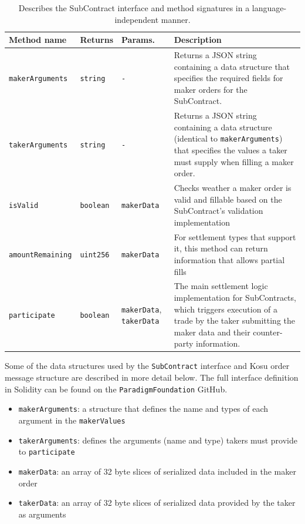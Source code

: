 \documentclass[10pt]{article}
\begin{document}
\bgroup
\def\arraystretch{1.2}
\begin{table}[H]
\centering
\label{table:table1}
\begin{tabularx}{1\textwidth}{|l|l|X|p{8cm}|}
\hline
\textbf{Method name} & \textbf{Returns} & \textbf{Params.} & \textbf{Description} \\ 
\hline
\texttt{makerArguments} & \texttt{string} & \texttt{-} & Returns a JSON string containing a data structure that specifies the required fields for maker orders for the SubContract. \\
\hline
\texttt{takerArguments} & \texttt{string} & \texttt{-} & Returns a JSON string containing a data structure (identical to \texttt{makerArguments}) that specifies the values a taker must supply when filling a maker order. \\
\hline
\texttt{isValid} & \texttt{boolean} & \texttt{makerData} & Checks weather a maker order is valid and fillable based on the SubContract's validation implementation \\
\hline
\texttt{amountRemaining} & \texttt{uint256} & \texttt{makerData} & For settlement types that support it, this method can return information that allows partial fills \\
\hline
\texttt{participate} & \texttt{boolean} & \texttt{makerData}, \texttt{takerData} & The main settlement logic implementation for SubContracts, which triggers execution of a trade by the taker submitting the maker data and their counter-party information. \\
\hline
\end{tabularx}
\caption{Describes the SubContract interface and method signatures in a language-independent manner.} 
\end{table}
\egroup

Some of the data structures used by the \texttt{SubContract} interface and Kosu order message structure are described in more detail below. The full interface definition in Solidity can be found on the \texttt{ParadigmFoundation} GitHub\cite{kosu-sdk}.

\begin{itemize}
  \item \texttt{makerArguments}: a structure that defines the name and types of each argument in the \texttt{makerValues}
  \item \texttt{takerArguments}: defines the arguments (name and type) takers must provide to \texttt{participate} 
  \item \texttt{makerData}: an array of 32 byte slices of serialized data included in the maker order
  \item \texttt{takerData}: an array of 32 byte slices of serialized data provided by the taker as arguments
\end{itemize}
\end{document}

